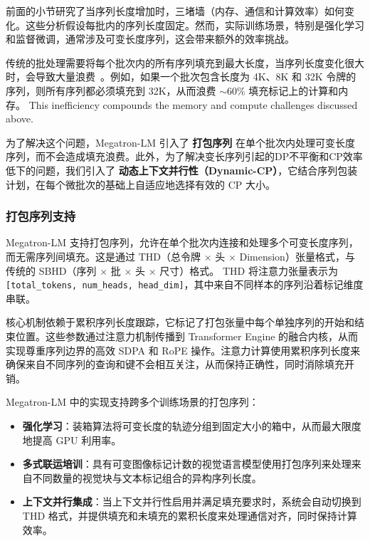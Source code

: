 \documentclass[10pt,logo,copyright]{nvidiatechreport_zh}
\begin{document}
前面的小节研究了当序列长度增加时，三堵墙（内存、通信和计算效率）如何变化。这些分析假设每批内的序列长度固定。然而，实际训练场景，特别是强化学习和监督微调，通常涉及可变长度序列，这会带来额外的效率挑战。

传统的批处理需要将每个批次内的所有序列填充到最大长度，当序列长度变化很大时，会导致大量浪费~\cite{krell2021efficient}。例如，如果一个批次包含长度为 4K、8K 和 32K 令牌的序列，则所有序列都必须填充到 32K，从而浪费 $\sim$60\% 填充标记上的计算和内存。 This inefficiency compounds the memory and compute challenges discussed above.

为了解决这个问题，Megatron-LM 引入了 \textbf{打包序列} 在单个批次内处理可变长度序列，而不会造成填充浪费。此外，为了解决变长序列引起的DP不平衡和CP效率低下的问题，我们引入了 \textbf{动态上下文并行性（Dynamic-CP）}，它结合序列包装计划，在每个微批次的基础上自适应地选择有效的 CP 大小。

\subsubsection{打包序列支持}\label{subsec:packed_sequence_support}

Megatron-LM 支持打包序列，允许在单个批次内连接和处理多个可变长度序列，而无需序列间填充。这是通过 THD（总令牌 $\times$ 头 $\times$ Dimension）张量格式，与传统的 SBHD（序列 $\times$ 批 $\times$ 头 $\times$ 尺寸）格式。 THD 将注意力张量表示为 \texttt{[total\_tokens, num\_heads, head\_dim]}，其中来自不同样本的序列沿着标记维度串联。

核心机制依赖于累积序列长度跟踪，它标记了打包张量中每个单独序列的开始和结束位置。这些参数通过注意力机制传播到 Transformer Engine 的融合内核，从而实现尊重序列边界的高效 SDPA 和 RoPE 操作。注意力计算使用累积序列长度来确保来自不同序列的查询和键不会相互关注，从而保持正确性，同时消除填充开销。

Megatron-LM 中的实现支持跨多个训练场景的打包序列：
\begin{itemize}
    \item \textbf{强化学习}：装箱算法将可变长度的轨迹分组到固定大小的箱中，从而最大限度地提高 GPU 利用率。
    \item \textbf{多式联运培训}：具有可变图像标记计数的视觉语言模型使用打包序列来处理来自不同数量的视觉块与文本标记组合的异构序列长度。
    \item \textbf{上下文并行集成}：当上下文并行性启用并满足填充要求时，系统会自动切换到 THD 格式，并提供填充和未填充的累积长度来处理通信对齐，同时保持计算效率。
\end{itemize}
\end{document}
